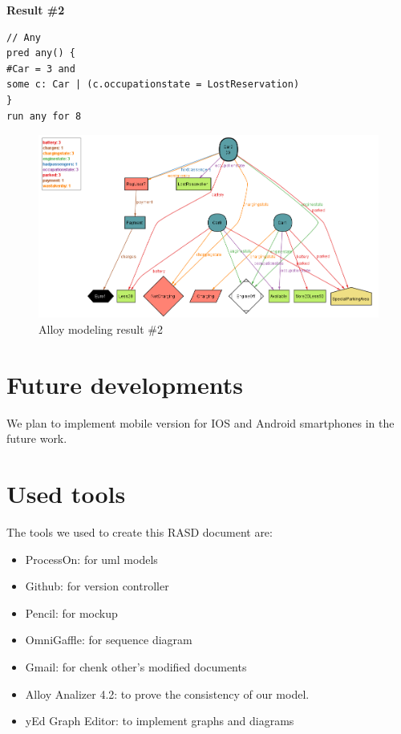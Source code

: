 \documentclass[12pt, letterpaper]{article}
\begin{document}
\textbf{Result \#2}

\begin{verbatim}
// Any
pred any() {
#Car = 3 and
some c: Car | (c.occupationstate = LostReservation)
}
run any for 8
\end{verbatim}

\begin{figure}[H]
\centering
\includegraphics[width=\textwidth]{alloycomplex.png}
\caption{Alloy modeling result \#2}
\end{figure}
\newpage


\section{Future developments}
We plan to implement mobile version for IOS and Android smartphones in the future
work.

\newpage
\section{Used tools}
The tools we used to create this RASD document are:
\begin{itemize}
	\item ProcessOn: for uml models
	\item Github: for version controller
	\item Pencil: for mockup
	\item OmniGaffle: for sequence diagram
	\item Gmail: for chenk other’s modified documents
	\item Alloy Analizer 4.2: to prove the consistency of our model.
	\item yEd Graph Editor: to implement graphs and diagrams
\end{itemize}
\newpage
\end{document}
